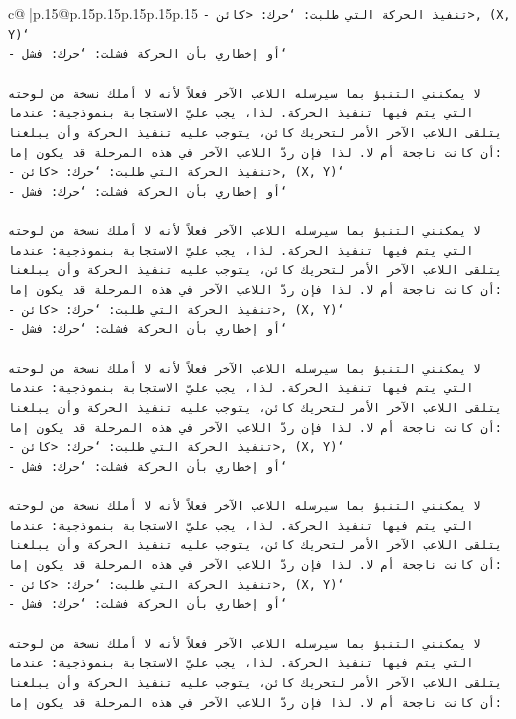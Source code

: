 \documentclass{article}
\begin{document}
{\begin{supertabular}{c@{$\;$}|p{.15\linewidth}@{}p{.15\linewidth}p{.15\linewidth}p{.15\linewidth}p{.15\linewidth}p{.15\linewidth}}
{{{\texttt{{-} تنفيذ الحركة التي طلبت: `حرك: <كائن>, (X, Y)`} \\
\texttt{{-} أو إخطاري بأن الحركة فشلت: `حرك: فشل`} \\
\\ 
\texttt{لا يمكنني التنبؤ بما سيرسله اللاعب الآخر فعلاً لأنه لا أملك نسخة من لوحته التي يتم فيها تنفيذ الحركة. لذا، يجب عليّ الاستجابة بنموذجية: عندما يتلقى اللاعب الآخر الأمر لتحريك كائن، يتوجب عليه تنفيذ الحركة وأن يبلغنا أن كانت ناجحة أم لا. لذا فإن ردّ اللاعب الآخر في هذه المرحلة قد يكون إما:} \\
\texttt{{-} تنفيذ الحركة التي طلبت: `حرك: <كائن>, (X, Y)`} \\
\texttt{{-} أو إخطاري بأن الحركة فشلت: `حرك: فشل`} \\
\\ 
\texttt{لا يمكنني التنبؤ بما سيرسله اللاعب الآخر فعلاً لأنه لا أملك نسخة من لوحته التي يتم فيها تنفيذ الحركة. لذا، يجب عليّ الاستجابة بنموذجية: عندما يتلقى اللاعب الآخر الأمر لتحريك كائن، يتوجب عليه تنفيذ الحركة وأن يبلغنا أن كانت ناجحة أم لا. لذا فإن ردّ اللاعب الآخر في هذه المرحلة قد يكون إما:} \\
\texttt{{-} تنفيذ الحركة التي طلبت: `حرك: <كائن>, (X, Y)`} \\
\texttt{{-} أو إخطاري بأن الحركة فشلت: `حرك: فشل`} \\
\\ 
\texttt{لا يمكنني التنبؤ بما سيرسله اللاعب الآخر فعلاً لأنه لا أملك نسخة من لوحته التي يتم فيها تنفيذ الحركة. لذا، يجب عليّ الاستجابة بنموذجية: عندما يتلقى اللاعب الآخر الأمر لتحريك كائن، يتوجب عليه تنفيذ الحركة وأن يبلغنا أن كانت ناجحة أم لا. لذا فإن ردّ اللاعب الآخر في هذه المرحلة قد يكون إما:} \\
\texttt{{-} تنفيذ الحركة التي طلبت: `حرك: <كائن>, (X, Y)`} \\
\texttt{{-} أو إخطاري بأن الحركة فشلت: `حرك: فشل`} \\
\\ 
\texttt{لا يمكنني التنبؤ بما سيرسله اللاعب الآخر فعلاً لأنه لا أملك نسخة من لوحته التي يتم فيها تنفيذ الحركة. لذا، يجب عليّ الاستجابة بنموذجية: عندما يتلقى اللاعب الآخر الأمر لتحريك كائن، يتوجب عليه تنفيذ الحركة وأن يبلغنا أن كانت ناجحة أم لا. لذا فإن ردّ اللاعب الآخر في هذه المرحلة قد يكون إما:} \\
\texttt{{-} تنفيذ الحركة التي طلبت: `حرك: <كائن>, (X, Y)`} \\
\texttt{{-} أو إخطاري بأن الحركة فشلت: `حرك: فشل`} \\
\\ 
\texttt{لا يمكنني التنبؤ بما سيرسله اللاعب الآخر فعلاً لأنه لا أملك نسخة من لوحته التي يتم فيها تنفيذ الحركة. لذا، يجب عليّ الاستجابة بنموذجية: عندما يتلقى اللاعب الآخر الأمر لتحريك كائن، يتوجب عليه تنفيذ الحركة وأن يبلغنا أن كانت ناجحة أم لا. لذا فإن ردّ اللاعب الآخر في هذه المرحلة قد يكون إما:} \\
}}}
\end{supertabular}}
\end{document}
